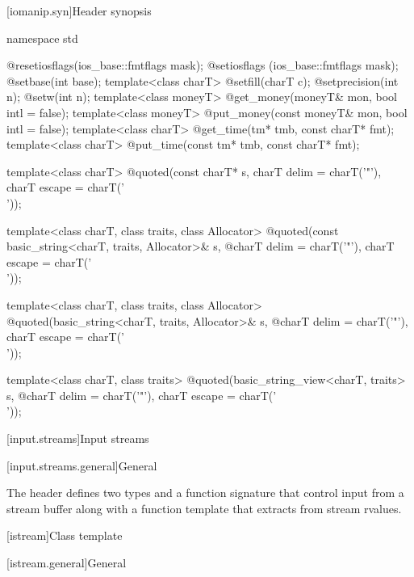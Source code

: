 %
%
%
%

[iomanip.syn]{Header  synopsis}

%
\begin{codeblock}
namespace std {
  @\unspec@ resetiosflags(ios_base::fmtflags mask);
  @\unspec@ setiosflags  (ios_base::fmtflags mask);
  @\unspec@ setbase(int base);
  template<class charT> @\unspec@ setfill(charT c);
  @\unspec@ setprecision(int n);
  @\unspec@ setw(int n);
  template<class moneyT> @\unspec@ get_money(moneyT& mon, bool intl = false);
  template<class moneyT> @\unspec@ put_money(const moneyT& mon, bool intl = false);
  template<class charT> @\unspec@ get_time(tm* tmb, const charT* fmt);
  template<class charT> @\unspec@ put_time(const tm* tmb, const charT* fmt);

  template<class charT>
    @\unspec@ quoted(const charT* s, charT delim = charT('"'), charT escape = charT('\\'));

  template<class charT, class traits, class Allocator>
    @\unspec@ quoted(const basic_string<charT, traits, Allocator>& s,
    @\itcorr@                   charT delim = charT('"'), charT escape = charT('\\'));

  template<class charT, class traits, class Allocator>
    @\unspec@ quoted(basic_string<charT, traits, Allocator>& s,
    @\itcorr@                   charT delim = charT('"'), charT escape = charT('\\'));

  template<class charT, class traits>
    @\unspec@ quoted(basic_string_view<charT, traits> s,
    @\itcorr@                   charT delim = charT('"'), charT escape = charT('\\'));
}
\end{codeblock}

[input.streams]{Input streams}

[input.streams.general]{General}

\pnum
The header  defines two types
and a function signature that control input from a stream buffer along with a function template that extracts from stream rvalues.

[istream]{Class template }

[istream.general]{General}

